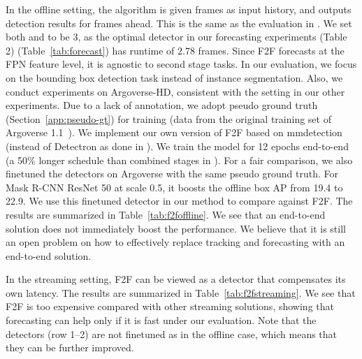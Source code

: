 In the offline setting, the algorithm is given  frames as input history, and outputs detection results for  frames ahead. This is the same as the evaluation in \cite{Luc2018PredictingFI}. We set both  and  to be 3, as the optimal detector in our forecasting experiments
\ifstandalonesupplement
    (Table 2)
\else
    (Table~\ref{tab:forecast})
\fi
has runtime of 2.78 frames. Since F2F forecasts at the FPN feature level, it is agnostic to second stage tasks. In our evaluation, we focus on the bounding box detection task instead of instance segmentation. Also, we conduct experiments on Argoverse-HD, consistent with the setting in our other experiments. Due to a lack of annotation, we adopt pseudo ground truth (Section~\ref{app:pseudo-gt}) for training (data from the original training set of Argoverse 1.1~\cite{Argoverse}). We implement our own version of F2F based on mmdetection (instead of Detectron as done in \cite{Luc2018PredictingFI}). We train the model for 12 epochs end-to-end (a 50\% longer schedule than combined stages in \cite{Luc2018PredictingFI}). For a fair comparison, we also finetuned the detectors on Argoverse with the same pseudo ground truth. For Mask R-CNN ResNet 50 at scale 0.5, it boosts the offline box AP from 19.4 to 22.9. We use this finetuned detector in our method to compare against F2F. The results are summarized in Table~\ref{tab:f2foffline}. We see that an end-to-end solution does not immediately boost the performance. We believe that it is still an open problem on how to effectively replace tracking and forecasting with an end-to-end solution.

In the streaming setting, 
F2F can be viewed as a detector that compensates its own latency. The results are summarized in Table~\ref{tab:f2fstreaming}. We see that F2F is too expensive compared with other streaming solutions, showing that forecasting can help only if it is fast under our evaluation. Note that the detectors (row 1--2) are not finetuned as in the offline case, which means that they can be further improved.


